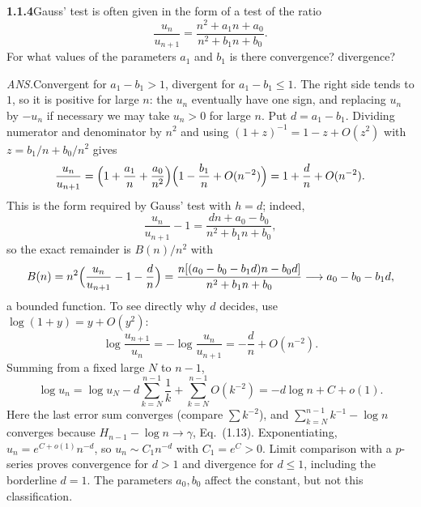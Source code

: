 \par\bigskip
\noindent\textbf{1.1.4}\quad Gauss' test is often given in the form of a test
of the ratio
\[
\frac{u_{n}}{u_{n+1}}=\frac{n^{2}+a_{1}n+a_{0}}{n^{2}+b_{1}n+b_{0}}.
\]
 For what values of the parameters $a_{1}$ and $b_{1}$ is there convergence?
divergence?
\par\nobreak\hfill\emph{ANS.}\enspace Convergent for $a_{1}-b_{1}>1$, divergent
for $a_{1}-b_{1}\leq1$.
\solution
The right side tends to $1$, so it is positive for large $n$: the $u_n$
eventually have one sign, and replacing $u_n$ by $-u_n$ if necessary we
may take $u_n>0$ for large $n$. Put $d=a_1-b_1$. Dividing
numerator and denominator by $n^2$ and using
$(1+z)^{-1}=1-z+O(z^2)$ with $z=b_1/n+b_0/n^2$ gives
\[
 \frac{u_n}{u_{n+1}}
 =\Bigl(1+\frac{a_1}n+\frac{a_0}{n^2}\Bigr)
  \Bigl(1-\frac{b_1}n+O(n^{-2})\Bigr)
 =1+\frac d n+O(n^{-2}).
\]
This is the form required by Gauss' test with $h=d$; indeed,
\[
 \frac{u_n}{u_{n+1}}-1=\frac{dn+a_0-b_0}{n^2+b_1n+b_0},
\]
so the exact remainder is $B(n)/n^2$ with
\[
 B(n)=n^2\Bigl(\frac{u_n}{u_{n+1}}-1-\frac dn\Bigr)
 =\frac{n[(a_0-b_0-b_1d)n-b_0d]}{n^2+b_1n+b_0}\longrightarrow a_0-b_0-b_1d,
\]
a bounded function. To see directly why $d$
decides, use $\log(1+y)=y+O(y^2)$:
\[
 \log\frac{u_{n+1}}{u_n}=-\log\frac{u_n}{u_{n+1}}=-\frac d n+O(n^{-2}).
\]
Summing from a fixed large $N$ to $n-1$,
\[
 \log u_n=\log u_N-d\sum_{k=N}^{n-1}\frac1k+
                   \sum_{k=N}^{n-1}O(k^{-2})
             =-d\log n+C+o(1).
\]
Here the last error sum converges (compare $\sum k^{-2}$), and
$\sum_{k=N}^{n-1}k^{-1}-\log n$ converges because
$H_{n-1}-\log n\to\gamma$, Eq.~(1.13). Exponentiating,
$u_n=e^{C+o(1)}n^{-d}$, so $u_n\sim C_1 n^{-d}$ with $C_1=e^C>0$.
Limit comparison with a $p$-series proves convergence for $d>1$ and
divergence for $d\le1$, including the borderline $d=1$.
The parameters $a_0,b_0$ affect the constant, but not this classification.


